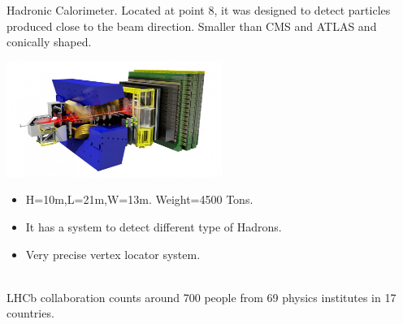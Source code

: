 \documentclass[8pt]{beamer}
\begin{document}
\begin{frame}[fragile]{Hadronic Calorimeter.}
	Located at point 8, it was designed to detect particles produced close to the beam direction.
	Smaller than CMS and ATLAS and conically shaped.
	
	\vspace{0.5cm}
	\begin{minipage}{0.7\textwidth}%
		\includegraphics[width=7cm]{8}
	\end{minipage}%
	\hfill%
	\begin{minipage}{0.3\textwidth}\raggedleft
		\begin{itemize}
			\item H=10m,L=21m,W=13m. Weight=4500 Tons.		
			\item It has a system to detect different type of Hadrons.
			\item Very precise vertex locator system.
			
		\end{itemize}
	\end{minipage}
	\\
	\vspace{0.5cm}
	LHCb collaboration counts around 700 people from 69 physics institutes in 17 countries.
\end{frame}
\end{document}
